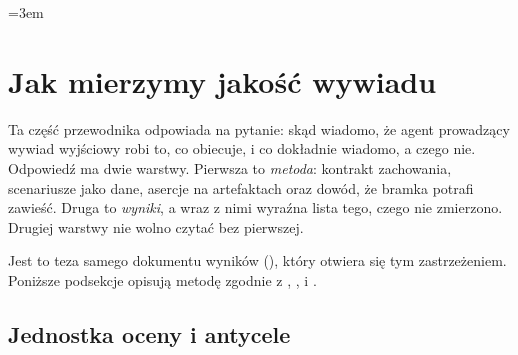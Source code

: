 
\emergencystretch=3em
\section{Jak mierzymy jakość wywiadu}
\label{sec:p4-jakosc}

Ta część przewodnika odpowiada na pytanie: skąd wiadomo, że agent prowadzący wywiad wyjściowy robi to, co obiecuje, i co dokładnie wiadomo, a czego nie. Odpowiedź ma dwie warstwy. Pierwsza to \emph{metoda}: kontrakt zachowania, scenariusze jako dane, asercje na artefaktach oraz dowód, że bramka potrafi zawieść. Druga to \emph{wyniki}, a wraz z nimi wyraźna lista tego, czego nie zmierzono. Drugiej warstwy nie wolno czytać bez pierwszej.


Jest to teza samego dokumentu wyników (), który otwiera się tym zastrzeżeniem. Poniższe podsekcje opisują metodę zgodnie z , ,  i .

\subsection{Jednostka oceny i antycele}

